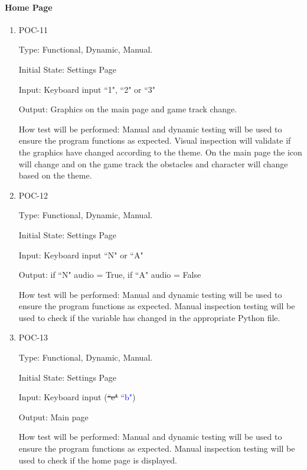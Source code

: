 \documentclass[12pt, titlepage]{article}
\begin{document}
	
	\paragraph{Home Page}
	
	\begin{enumerate}
		
		\item{POC-11\\}
		
		Type: Functional, Dynamic, Manual. 
		
		Initial State: Settings Page
		
		Input: Keyboard input ``1", ``2" or ``3" 
		
		Output: Graphics on the main page and game track change. 
		
		How test will be performed: Manual and dynamic testing will be used to ensure the program functions as expected. Visual inspection will validate if the graphics have changed according to the theme. On the main page the icon will change and on the game track the obstacles and character will change based on the theme. 
		
		\item{POC-12\\}
		
		Type: Functional, Dynamic, Manual.
		
		Initial State: Settings Page
		
		Input: Keyboard input ``N" or ``A" 
		
		Output: if ``N" audio = True, if ``A" audio = False
		
		How test will be performed: Manual and dynamic testing will be used to ensure the program functions as expected. Manual inspection testing will be used to check if the variable has changed in the appropriate Python file. 
		
		\item{POC-13\\}
		
		Type: Functional, Dynamic, Manual.
		
		Initial State: Settings Page
		
		Input: Keyboard input (\sout{``e"} \textcolor{blue}{``b"})
		
		Output: Main page
		
		How test will be performed: Manual and dynamic testing will be used to ensure the program functions as expected. Manual inspection testing will be used to check if the home page is displayed. 
		
	\end{enumerate}
	
\end{document}
